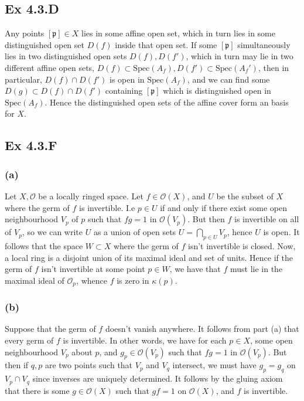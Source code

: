 \documentclass{article}
\theoremstyle{definition}
\newcommand{\oo}{\mathcal{O}}
\newcommand{\Spec}{\text{Spec}}
\begin{document}
\subsection*{Ex 4.3.D}

Any points $[\mathfrak{p}] \in X$ lies in some affine open set, which in turn
lies in some distinguished open set $D(f)$ inside that open set. If some
$[\mathfrak{p}]$ simultaneously lies in two distinguished open sets $D(f),
	D(f')$, which in turn may lie in two different affine open sets, $D(f) \subset
	\Spec(A_f), D(f') \subset \Spec(A_f')$, then in particular, $D(f) \cap D(f')$
is open in $\Spec(A_f)$, and we can find some $D(g) \subset D(f) \cap D(f')$
containing $[\mathfrak{p}]$ which is distinguished open in $\Spec(A_f)$. Hence
the distinguished open sets of the affine cover form an basis for $X$.

\subsection*{Ex 4.3.F}

\subsubsection*{(a)}

Let $X, \oo$ be a locally ringed space. Let $f \in \oo(X)$, and $U$ be the
subset of $X$ where the germ of $f$ is invertible. I.e $p \in U$ if and only if
there exist some open neighbourhood $V_p$ of $p$ such that $fg = 1$ in
$\oo(V_p)$. But then $f$ is invertible on all of $V_p$, so we can write $U$ as
a union of open sets $U = \bigcap_{p \in U} V_p$, hence $U$ is open. It follows
that the space $W \subset X$ where the germ of $f$ isn't invertible is closed.
Now, a local ring is a disjoint union of its maximal ideal and set of units.
Hence if the germ of $f$ isn't invertible at some point $p \in W$, we have that
$f$ must lie in the maximal ideal of $\mathcal{O}_p$, whence $f$ is zero in
$\kappa(p)$.

\subsubsection*{(b)}

Suppose that the germ of $f$ doesn't vanish anywhere. It follows from part (a)
that every germ of $f$ is invertible. In other words, we have for each $p \in
	X$, some open neighbourhood $V_p$ about $p$, and $g_p \in \oo(V_p)$ such that
$fg = 1$ in $\oo(V_p)$. But then if $q, p$ are two points such that $V_p$ and
$V_q$ intersect, we must have $g_p = g_q$ on $V_p \cap V_q$ since inverses are
uniquely determined. It follows by the gluing axiom that there is some $g \in
	\oo(X)$ such that $gf = 1$ on $\oo(X)$, and $f$ is invertible.
\end{document}
